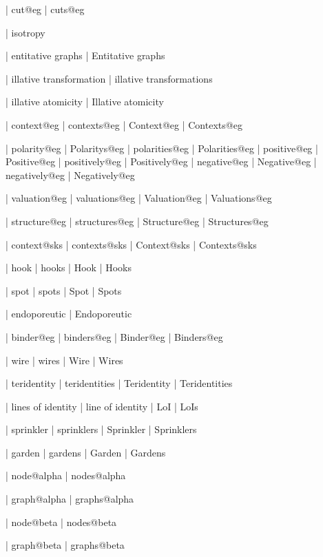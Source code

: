  | cut@eg
 | cuts@eg

 | isotropy

 | entitative graphs
 | Entitative graphs

 | illative transformation
 | illative transformations

 | illative atomicity
 | Illative atomicity
 
 | context@eg
 | contexts@eg
 | Context@eg
 | Contexts@eg

 | polarity@eg
 | Polaritys@eg
 | polarities@eg
 | Polarities@eg
 | positive@eg
 | Positive@eg
 | positively@eg
 | Positively@eg
 | negative@eg
 | Negative@eg
 | negatively@eg
 | Negatively@eg

 | valuation@eg
 | valuations@eg
 | Valuation@eg
 | Valuations@eg

 | structure@eg
 | structures@eg
 | Structure@eg
 | Structures@eg

 | context@sks
 | contexts@sks
 | Context@sks
 | Contexts@sks

 | hook
 | hooks
 | Hook
 | Hooks

 | spot
 | spots
 | Spot
 | Spots
 
 | endoporeutic
 | Endoporeutic

 | binder@eg
 | binders@eg
 | Binder@eg
 | Binders@eg

 | wire
 | wires
 | Wire
 | Wires

 | teridentity
 | teridentities
 | Teridentity
 | Teridentities

 | lines of identity
 | line of identity
 | LoI
 | LoIs

 | sprinkler
 | sprinklers
 | Sprinkler
 | Sprinklers

 | garden
 | gardens
 | Garden
 | Gardens

 | node@alpha
 | nodes@alpha

 | graph@alpha
 | graphs@alpha

 | node@beta
 | nodes@beta

 | graph@beta
 | graphs@beta

